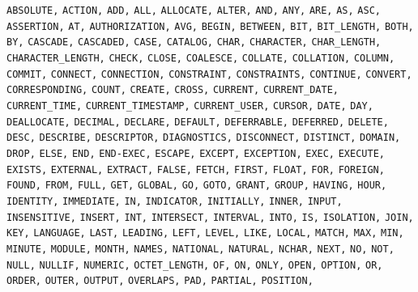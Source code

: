 \documentclass[11pt,a4paper]{ivoa}
\begin{document}
\noindent
\texttt{ABSOLUTE,} \texttt{ACTION,} \texttt{ADD,} \texttt{ALL,} 
\texttt{ALLOCATE,} \texttt{ALTER,} \texttt{AND,} \texttt{ANY,} 
\texttt{ARE,} \texttt{AS,} \texttt{ASC,} \texttt{ASSERTION,} 
\texttt{AT,} \texttt{AUTHORIZATION,} \texttt{AVG,} \texttt{BEGIN,} 
\texttt{BETWEEN,} \texttt{BIT,} \texttt{BIT\_LENGTH,} \texttt{BOTH,} 
\texttt{BY,} \texttt{CASCADE,} \texttt{CASCADED,} \texttt{CASE,} 
\texttt{CATALOG,} \texttt{CHAR,} \texttt{CHARACTER,}
\texttt{CHAR\_LENGTH,} \texttt{CHARACTER\_LENGTH,} \texttt{CHECK,} 
\texttt{CLOSE,} \texttt{COALESCE,} \texttt{COLLATE,} 
\texttt{COLLATION,} \texttt{COLUMN,} \texttt{COMMIT,} 
\texttt{CONNECT,} \texttt{CONNECTION,} \texttt{CONSTRAINT,} 
\texttt{CONSTRAINTS,} \texttt{CONTINUE,} \texttt{CONVERT,} 
\texttt{CORRESPONDING,} \texttt{COUNT,} \texttt{CREATE,} 
\texttt{CROSS,} \texttt{CURRENT,} \texttt{CURRENT\_DATE,} 
\texttt{CURRENT\_TIME,} \texttt{CURRENT\_TIMESTAMP,} 
\texttt{CURRENT\_USER,} \texttt{CURSOR,} \texttt{DATE,} \texttt{DAY,} 
\texttt{DEALLOCATE,} \texttt{DECIMAL,} \texttt{DECLARE,} 
\texttt{DEFAULT,} \texttt{DEFERRABLE,} \texttt{DEFERRED,} 
\texttt{DELETE,} \texttt{DESC,} \texttt{DESCRIBE,} 
\texttt{DESCRIPTOR,} \texttt{DIAGNOSTICS,} \texttt{DISCONNECT,} 
\texttt{DISTINCT,} \texttt{DOMAIN,} \texttt{DROP,} 
\texttt{ELSE,} \texttt{END,} \texttt{END-EXEC,} \texttt{ESCAPE,} 
\texttt{EXCEPT,} \texttt{EXCEPTION,} \texttt{EXEC,} \texttt{EXECUTE,} 
\texttt{EXISTS,} \texttt{EXTERNAL,} \texttt{EXTRACT,} \texttt{FALSE,} 
\texttt{FETCH,} \texttt{FIRST,} \texttt{FLOAT,} \texttt{FOR,} 
\texttt{FOREIGN,} \texttt{FOUND,} \texttt{FROM,} \texttt{FULL,} 
\texttt{GET,} \texttt{GLOBAL,} \texttt{GO,} \texttt{GOTO,} 
\texttt{GRANT,} \texttt{GROUP,} \texttt{HAVING,} \texttt{HOUR,} 
\texttt{IDENTITY,} \texttt{IMMEDIATE,} \texttt{IN,}
\texttt{INDICATOR,} \texttt{INITIALLY,} \texttt{INNER,} 
\texttt{INPUT,} \texttt{INSENSITIVE,} \texttt{INSERT,} \texttt{INT,} 
\texttt{INTERSECT,} \texttt{INTERVAL,} 
\texttt{INTO,} \texttt{IS,} \texttt{ISOLATION,} \texttt{JOIN,} 
\texttt{KEY,} \texttt{LANGUAGE,} \texttt{LAST,} \texttt{LEADING,} 
\texttt{LEFT,} \texttt{LEVEL,} \texttt{LIKE,} \texttt{LOCAL,} 
\texttt{MATCH,} \texttt{MAX,} \texttt{MIN,} 
\texttt{MINUTE,} \texttt{MODULE,} \texttt{MONTH,} \texttt{NAMES,} 
\texttt{NATIONAL,} \texttt{NATURAL,} \texttt{NCHAR,} \texttt{NEXT,} 
\texttt{NO,} \texttt{NOT,} \texttt{NULL,} \texttt{NULLIF,} 
\texttt{NUMERIC,} \texttt{OCTET\_LENGTH,} \texttt{OF,} \texttt{ON,} 
\texttt{ONLY,} \texttt{OPEN,} \texttt{OPTION,} \texttt{OR,} 
\texttt{ORDER,} \texttt{OUTER,} \texttt{OUTPUT,} \texttt{OVERLAPS,} 
\texttt{PAD,} \texttt{PARTIAL,} \texttt{POSITION,} 
\end{document}
